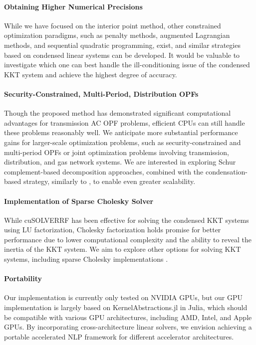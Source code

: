 \paragraph*{Obtaining Higher Numerical Precisions} While we have
focused on the interior point method, other constrained optimization
paradigms, such as penalty methods, augmented Lagrangian methods, and
sequential quadratic programming, exist, and similar strategies based
on condensed linear systems can be developed. It would be valuable to
investigate which one can best handle the ill-conditioning issue of
the condensed KKT system and achieve the highest degree of accuracy.

\paragraph*{Security-Constrained, Multi-Period, Distribution OPFs}
Though the proposed method has demonstrated significant computational
advantages for transmission AC OPF problems, efficient CPUs can still
handle these problems reasonably well. We anticipate more substantial
performance gains for larger-scale optimization problems, such as
security-constrained and multi-period OPFs or joint optimization
problems involving transmission, distribution, and gas network
systems. We are interested in exploring Schur complement-based
decomposition approaches, combined with the condensation-based
strategy, similarly to \cite{pacaud2023parallel}, to enable even greater scalability.

\paragraph*{Implementation of Sparse Cholesky Solver} While cuSOLVERRF
has been effective for solving the condensed KKT systems using LU
factorization, Cholesky factorization holds promise for better
performance due to lower computational complexity and the ability to
reveal the inertia of the KKT system. We aim to explore other options
for solving KKT systems, including sparse Cholesky implementations
\cite{chen2008algorithm,pineda2022theseus,regev2023hykkt}.

\paragraph*{Portability} Our implementation is currently only tested
on NVIDIA GPUs, but our GPU implementation is largely based on
KernelAbstractions.jl in Julia, which should be compatible with
various GPU architectures, including AMD, Intel, and Apple GPUs. By
incorporating cross-architecture linear solvers, we envision achieving
a portable accelerated NLP framework for different accelerator
architectures.

